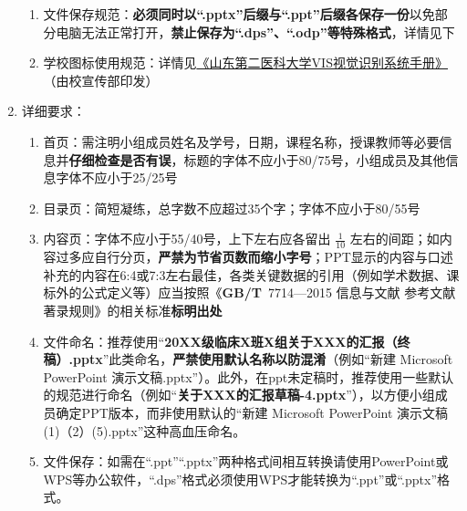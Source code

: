 \begin{enumerate}
\begin{enumerate}
                  \item 文件保存规范\footnotemark：\textbf{必须同时以“.pptx”后缀与“.ppt”后缀各保存一份}以免部分电脑无法正常打开，\textbf{禁止保存为“.dps”、“.odp”等特殊格式}，详情见下
                  \item 学校图标使用规范：详情见\uline{\href{https://www.wfmc.edu.cn/4229/list.htm}{《山东第二医科大学VIS视觉识别系统手册》}}（由校宣传部印发）
            \end{enumerate}
      \item 详细要求：
            \begin{enumerate}
                  \item 首页：需注明小组成员姓名及学号，日期，课程名称，授课教师等必要信息并\textbf{仔细检查是否有误}，标题的字体不应小于80/75号，小组成员及其他信息字体不应小于25/25号
                  \item 目录页：简短凝练，总字数不应超过35个字；字体不应小于80/55号
                  \item 内容页：字体\footnotemark 不应小于55/40号，上下左右应各留出 $\frac{1}{10}$ 左右的间距；如内容过多应自行分页，\textbf{严禁为节省页数而缩小字号}；PPT显示的内容与口述补充的内容在6:4或7:3左右最佳，各类关键数据的引用（例如学术数据、课标外的公式定义等）应当按照\linebreak[3]《\textbf{GB/T}\ 7714—2015 信息与文献 参考文献著录规则》的相关标准\textbf{标明出处}
                  \item 文件命名\footnotemark：推荐使用“\textbf{20XX级临床X班X组关于XXX的汇报（终稿）.pptx}”此类命名，\textbf{严禁使用默认名称以防混淆}（例如“新建 Microsoft PowerPoint 演示文稿.pptx”）。此外，在ppt未定稿时，推荐使用一些默认的规范进行命名（例如“\textbf{关于XXX的汇报草稿-4.pptx}”），以方便小组成员确定PPT版本，而非使用默认的“新建 Microsoft PowerPoint 演示文稿(1)（2）(5).pptx”这种高血压命名。
                  \item 文件保存\footnotemark：如需在“.ppt”“.pptx”两种格式间相互转换请使用PowerPoint或WPS等办公软件，“.dps”格式必须使用WPS才能转换为“.ppt”或“.pptx”格式。
            \end{enumerate}

\end{enumerate}

